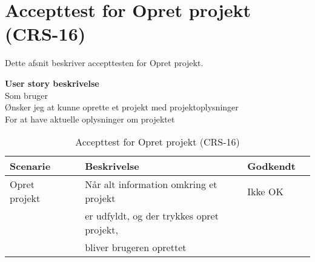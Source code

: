 \section{Accepttest for Opret projekt (CRS-16)}
Dette afsnit beskriver accepttesten for Opret projekt.

\textbf{User story beskrivelse} \\
Som bruger \\
Ønsker jeg at kunne oprette et projekt med projektoplysninger \\
For at have aktuelle oplysninger om projektet

\begin{table}[H]
	\centering
	\begin{tabular}{|ll|l|ll|} \hline
		\textbf{Scenarie} &  & \textbf{Beskrivelse}&  \textbf{Godkendt}&  \\ \hline
		Opret projekt&  &  Når alt information omkring et projekt &  Ikke OK&  \\
		& & er udfyldt, og der trykkes opret projekt, & & \\
		& & bliver brugeren oprettet& & \\ \hline
	\end{tabular}
	\caption{Accepttest for Opret projekt (CRS-16)}
	\label{AcceptOpretProjekt}
\end{table}